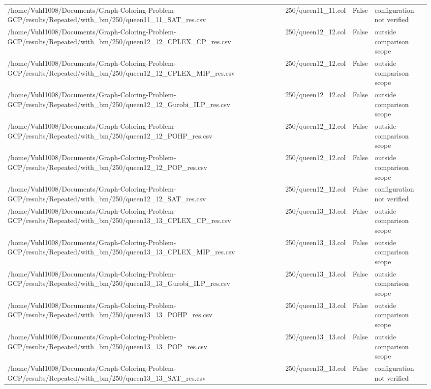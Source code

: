 \begin{table}[htbp]
\begin{tabular}{llll}
/home/Vuhl1008/Documents/Graph-Coloring-Problem-GCP/results/Repeated/with\_bm/250/queen11\_11\_SAT\_res.csv & 250/queen11\_11.col & False & configuration not verified \\
/home/Vuhl1008/Documents/Graph-Coloring-Problem-GCP/results/Repeated/with\_bm/250/queen12\_12\_CPLEX\_CP\_res.csv & 250/queen12\_12.col & False & outside comparison scope \\
/home/Vuhl1008/Documents/Graph-Coloring-Problem-GCP/results/Repeated/with\_bm/250/queen12\_12\_CPLEX\_MIP\_res.csv & 250/queen12\_12.col & False & outside comparison scope \\
/home/Vuhl1008/Documents/Graph-Coloring-Problem-GCP/results/Repeated/with\_bm/250/queen12\_12\_Gurobi\_ILP\_res.csv & 250/queen12\_12.col & False & outside comparison scope \\
/home/Vuhl1008/Documents/Graph-Coloring-Problem-GCP/results/Repeated/with\_bm/250/queen12\_12\_POHP\_res.csv & 250/queen12\_12.col & False & outside comparison scope \\
/home/Vuhl1008/Documents/Graph-Coloring-Problem-GCP/results/Repeated/with\_bm/250/queen12\_12\_POP\_res.csv & 250/queen12\_12.col & False & outside comparison scope \\
/home/Vuhl1008/Documents/Graph-Coloring-Problem-GCP/results/Repeated/with\_bm/250/queen12\_12\_SAT\_res.csv & 250/queen12\_12.col & False & configuration not verified \\
/home/Vuhl1008/Documents/Graph-Coloring-Problem-GCP/results/Repeated/with\_bm/250/queen13\_13\_CPLEX\_CP\_res.csv & 250/queen13\_13.col & False & outside comparison scope \\
/home/Vuhl1008/Documents/Graph-Coloring-Problem-GCP/results/Repeated/with\_bm/250/queen13\_13\_CPLEX\_MIP\_res.csv & 250/queen13\_13.col & False & outside comparison scope \\
/home/Vuhl1008/Documents/Graph-Coloring-Problem-GCP/results/Repeated/with\_bm/250/queen13\_13\_Gurobi\_ILP\_res.csv & 250/queen13\_13.col & False & outside comparison scope \\
/home/Vuhl1008/Documents/Graph-Coloring-Problem-GCP/results/Repeated/with\_bm/250/queen13\_13\_POHP\_res.csv & 250/queen13\_13.col & False & outside comparison scope \\
/home/Vuhl1008/Documents/Graph-Coloring-Problem-GCP/results/Repeated/with\_bm/250/queen13\_13\_POP\_res.csv & 250/queen13\_13.col & False & outside comparison scope \\
/home/Vuhl1008/Documents/Graph-Coloring-Problem-GCP/results/Repeated/with\_bm/250/queen13\_13\_SAT\_res.csv & 250/queen13\_13.col & False & configuration not verified \\

\end{tabular}
\end{table}
